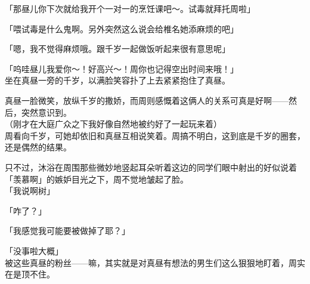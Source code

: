 「那昼儿你下次就给我开个一对一的烹饪课吧～。试毒就拜托周啦」

「喂试毒是什么鬼啊。另外突然这么说会给椎名她添麻烦的吧」

「嗯，我不觉得麻烦哦。跟千岁一起做饭听起来很有意思呢」

「呜哇昼儿我爱你～！好高兴～！周你也记得空出时间来哦！」\\

坐在真昼一旁的千岁，以满脸笑容扑了上去紧紧抱住了真昼。

真昼一脸微笑，放纵千岁的撒娇，而周则感慨着这俩人的关系可真是好啊——然后，突然意识到。\\

（刚才在大庭广众之下我好像自然地被约好了一起玩来着）\\

周看向千岁，可她却依旧和真昼互相说笑着。周搞不明白，这到底是千岁的圈套，还是偶然的结果。

只不过，沐浴在周围那些微妙地竖起耳朵听着这边的同学们眼中射出的好似说着「羡慕啊」的嫉妒目光之下，周不觉地皱起了脸。\\

「我说啊树」

「咋了？」

「我感觉我可能要被做掉了耶？」

「没事啦大概」\\

被这些真昼的粉丝——嘛，其实就是对真昼有想法的男生们这么狠狠地盯着，周实在是顶不住。\\

